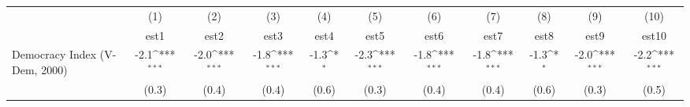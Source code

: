{
\def\sym#1{\ifmmode^{#1}\else\(^{#1}\)\fi}
\begin{tabular}{l*{10}{c}}
                &\multicolumn{1}{c}{(1)}         &\multicolumn{1}{c}{(2)}         &\multicolumn{1}{c}{(3)}         &\multicolumn{1}{c}{(4)}         &\multicolumn{1}{c}{(5)}         &\multicolumn{1}{c}{(6)}         &\multicolumn{1}{c}{(7)}         &\multicolumn{1}{c}{(8)}         &\multicolumn{1}{c}{(9)}         &\multicolumn{1}{c}{(10)}         \\
                &     est1         &     est2         &     est3         &     est4         &     est5         &     est6         &     est7         &     est8         &     est9         &    est10         \\
Democracy Index (V-Dem, 2000)&     -2.1\sym{***}&     -2.0\sym{***}&     -1.8\sym{***}&     -1.3\sym{*}  &     -2.3\sym{***}&     -1.8\sym{***}&     -1.8\sym{***}&     -1.3\sym{*}  &     -2.0\sym{***}&     -2.2\sym{***}\\
                &    (0.3)         &    (0.4)         &    (0.4)         &    (0.6)         &    (0.3)         &    (0.4)         &    (0.4)         &    (0.6)         &    (0.3)         &    (0.5)         \\
\end{tabular}
}

